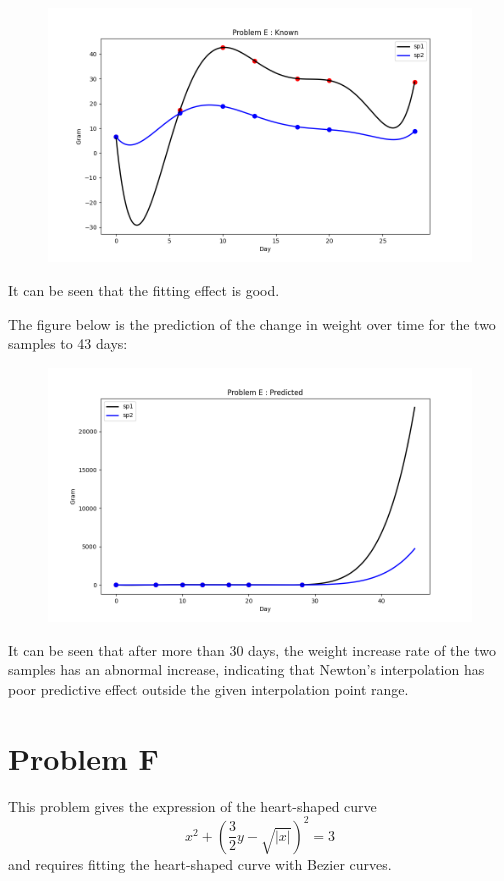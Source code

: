 \documentclass[a4paper]{article}
\begin{document}
\begin{figure}[h]
    \centering
    \includegraphics[width=0.75\linewidth]{Pictures/ProblemE_figure_Known.png}
    
\end{figure}

It can be seen that the fitting effect is good.

\newpage
The figure below is the prediction of the change in weight over time for the two samples to 43 days:

\begin{figure}[h]
    \centering
    \includegraphics[width=0.75\linewidth]{Pictures/ProblemE_figure_Predicted.png}
    
\end{figure}

It can be seen that after more than 30 days, the weight increase rate of the two samples has an abnormal increase, indicating that Newton's interpolation has poor predictive effect outside the given interpolation point range.


\section*{Problem F}

This problem gives the expression of the heart-shaped curve
\[
    x^2 + \left(\frac{3}{2}y - \sqrt{|x|}\right)^2 = 3
\]
and requires fitting the heart-shaped curve with Bezier curves.
\end{document}
